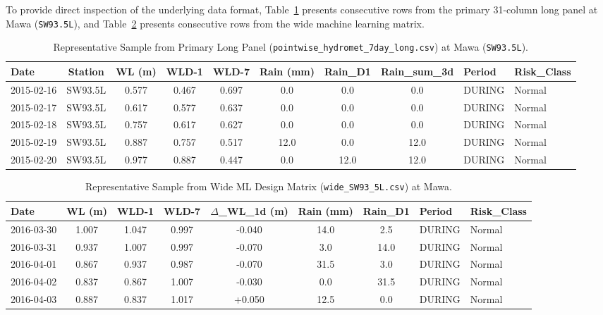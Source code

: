 \documentclass[11pt,a4paper]{article}
\begin{document}
To provide direct inspection of the underlying data format, Table~\ref{tab:sample_long} presents consecutive rows from the primary 31-column long panel at Mawa (\texttt{SW93.5L}), and Table~\ref{tab:sample_wide} presents consecutive rows from the wide machine learning matrix.

\begin{table}[htbp]\centering\scriptsize
\caption{Representative Sample from Primary Long Panel (\texttt{pointwise\_hydromet\_7day\_long.csv}) at Mawa (\texttt{SW93.5L}).}
\label{tab:sample_long}
\begin{tabularx}{\linewidth}{|l|c|c|c|c|c|c|c|>{\centering\arraybackslash}X|>{\centering\arraybackslash}X|}
\hline
\rowcolor{wordheadbg} \textbf{Date} & \textbf{Station} & \textbf{WL (m)} & \textbf{WLD-1} & \textbf{WLD-7} & \textbf{Rain (mm)} & \textbf{Rain\_D1} & \textbf{Rain\_sum\_3d} & \textbf{Period} & \textbf{Risk\_Class} \\ \hline
2015-02-16 & SW93.5L & 0.577 & 0.467 & 0.697 & 0.0 & 0.0 & 0.0 & DURING & Normal \\ \hline
2015-02-17 & SW93.5L & 0.617 & 0.577 & 0.637 & 0.0 & 0.0 & 0.0 & DURING & Normal \\ \hline
2015-02-18 & SW93.5L & 0.757 & 0.617 & 0.627 & 0.0 & 0.0 & 0.0 & DURING & Normal \\ \hline
2015-02-19 & SW93.5L & 0.887 & 0.757 & 0.517 & 12.0 & 0.0 & 12.0 & DURING & Normal \\ \hline
2015-02-20 & SW93.5L & 0.977 & 0.887 & 0.447 & 0.0 & 12.0 & 12.0 & DURING & Normal \\ \hline
\end{tabularx}
\end{table}

\begin{table}[htbp]\centering\scriptsize
\caption{Representative Sample from Wide ML Design Matrix (\texttt{wide\_SW93\_5L.csv}) at Mawa.}
\label{tab:sample_wide}
\begin{tabularx}{\linewidth}{|l|c|c|c|c|c|c|>{\centering\arraybackslash}X|>{\centering\arraybackslash}X|}
\hline
\rowcolor{wordheadbg} \textbf{Date} & \textbf{WL (m)} & \textbf{WLD-1} & \textbf{WLD-7} & \textbf{$\Delta$\_WL\_1d (m)} & \textbf{Rain (mm)} & \textbf{Rain\_D1} & \textbf{Period} & \textbf{Risk\_Class} \\ \hline
2016-03-30 & 1.007 & 1.047 & 0.997 & -0.040 & 14.0 & 2.5 & DURING & Normal \\ \hline
2016-03-31 & 0.937 & 1.007 & 0.997 & -0.070 & 3.0 & 14.0 & DURING & Normal \\ \hline
2016-04-01 & 0.867 & 0.937 & 0.987 & -0.070 & 31.5 & 3.0 & DURING & Normal \\ \hline
2016-04-02 & 0.837 & 0.867 & 1.007 & -0.030 & 0.0 & 31.5 & DURING & Normal \\ \hline
2016-04-03 & 0.887 & 0.837 & 1.017 & +0.050 & 12.5 & 0.0 & DURING & Normal \\ \hline
\end{tabularx}
\end{table}
\end{document}
